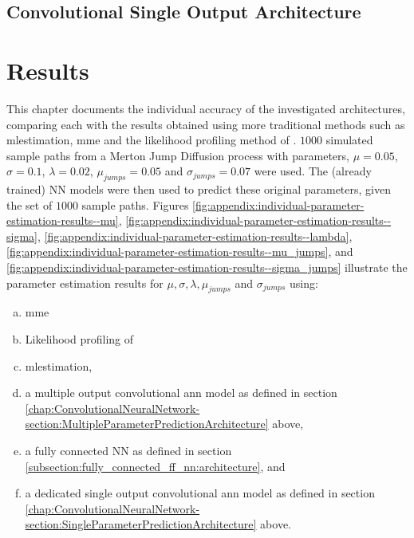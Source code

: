 \documentclass[11pt,oneside,openany,a4paper,english, report, goldenblock
]{usthesis}
\begin{document}
\clearpage
\section{Convolutional Single Output Architecture}

\chapter[Appendix C]{Results}
\label{appendix:results}

This chapter documents the individual accuracy of the investigated architectures, comparing each with the results obtained using more traditional methods such as \acrshort{mlestimation}, \acrshort{mme} and the likelihood profiling method of \citet{Honore}. $1000$ simulated sample paths from a Merton Jump Diffusion process with parameters, $\mu = 0.05$, $\sigma = 0.1$, $\lambda = 0.02$, $\mu_{jumps} = 0.05$ and $\sigma_{jumps} = 0.07$ were used. The (already trained) NN models were then used to predict these original parameters, given the set of $1000$ sample paths. Figures \ref{fig:appendix:individual-parameter-estimation-results--mu}, \ref{fig:appendix:individual-parameter-estimation-results--sigma}, \ref{fig:appendix:individual-parameter-estimation-results--lambda}, \ref{fig:appendix:individual-parameter-estimation-results--mu_jumps}, and \ref{fig:appendix:individual-parameter-estimation-results--sigma_jumps} illustrate the parameter estimation results for $\mu, \sigma, \lambda, \mu_{jumps}$ and $\sigma_{jumps}$ using: 

\begin{enumerate}[a)]
	\itemsep0em 
	\item  \acrshort{mme}
	\item  Likelihood profiling of \citet{Honore}
	\item  \acrshort{mlestimation},
	\item a multiple output convolutional \acrshort{ann} model as defined in section \ref{chap:ConvolutionalNeuralNetwork-section:MultipleParameterPredictionArchitecture} above,
	\item a fully connected NN as defined in section \ref{subsection:fully_connected_ff_nn:architecture}, and
	\item a dedicated single output convolutional \acrshort{ann} model as defined in section \ref{chap:ConvolutionalNeuralNetwork-section:SingleParameterPredictionArchitecture} above.

\end{enumerate}
\end{document}
